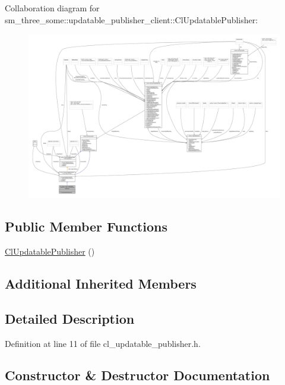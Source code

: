 Collaboration diagram for sm\+\_\+three\+\_\+some\+:\+:updatable\+\_\+publisher\+\_\+client\+:\+:Cl\+Updatable\+Publisher\+:
\nopagebreak
\begin{figure}[H]
\begin{center}
\leavevmode
\includegraphics[width=350pt]{classsm__three__some_1_1updatable__publisher__client_1_1ClUpdatablePublisher__coll__graph}
\end{center}
\end{figure}
\subsection*{Public Member Functions}
\begin{DoxyCompactItemize}
\item 
\hyperlink{classsm__three__some_1_1updatable__publisher__client_1_1ClUpdatablePublisher_aef337a2197962c12eb5319b94decf975}{Cl\+Updatable\+Publisher} ()
\end{DoxyCompactItemize}
\subsection*{Additional Inherited Members}


\subsection{Detailed Description}


Definition at line 11 of file cl\+\_\+updatable\+\_\+publisher.\+h.



\subsection{Constructor \& Destructor Documentation}

